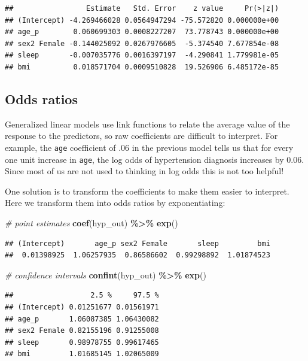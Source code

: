 \documentclass[
]{book}
\newenvironment{Shaded}{\begin{snugshade}}{\end{snugshade}}
\newcommand{\CommentTok}[1]{\textcolor[rgb]{0.56,0.35,0.01}{\textit{#1}}}
\newcommand{\KeywordTok}[1]{\textcolor[rgb]{0.13,0.29,0.53}{\textbf{#1}}}
\newcommand{\NormalTok}[1]{#1}
\newcommand{\OperatorTok}[1]{\textcolor[rgb]{0.81,0.36,0.00}{\textbf{#1}}}
\newcommand{\StringTok}[1]{\textcolor[rgb]{0.31,0.60,0.02}{#1}}
\begin{document}
\begin{verbatim}
##                 Estimate   Std. Error    z value     Pr(>|z|)
## (Intercept) -4.269466028 0.0564947294 -75.572820 0.000000e+00
## age_p        0.060699303 0.0008227207  73.778743 0.000000e+00
## sex2 Female -0.144025092 0.0267976605  -5.374540 7.677854e-08
## sleep       -0.007035776 0.0016397197  -4.290841 1.779981e-05
## bmi          0.018571704 0.0009510828  19.526906 6.485172e-85
\end{verbatim}

\hypertarget{odds-ratios}{%
\subsection{Odds ratios}\label{odds-ratios}}

Generalized linear models use link functions to relate the average value of the response to the predictors,
so raw coefficients are difficult to interpret. For example, the \texttt{age} coefficient of .06 in the previous
model tells us that for every one unit increase in \texttt{age}, the log odds of hypertension diagnosis increases
by 0.06. Since most of us are not used to thinking in log odds this is not too helpful!

One solution is to transform the coefficients to make them easier to interpret.
Here we transform them into odds ratios by exponentiating:

\begin{Shaded}
\begin{Highlighting}[]
  \CommentTok{\# point estimates}
  \KeywordTok{coef}\NormalTok{(hyp\_out) }\OperatorTok{\%\textgreater{}\%}\StringTok{ }\KeywordTok{exp}\NormalTok{()}
\end{Highlighting}
\end{Shaded}

\begin{verbatim}
## (Intercept)       age_p sex2 Female       sleep         bmi 
##  0.01398925  1.06257935  0.86586602  0.99298892  1.01874523
\end{verbatim}

\begin{Shaded}
\begin{Highlighting}[]
  \CommentTok{\# confidence intervals}
  \KeywordTok{confint}\NormalTok{(hyp\_out) }\OperatorTok{\%\textgreater{}\%}\StringTok{ }\KeywordTok{exp}\NormalTok{()}
\end{Highlighting}
\end{Shaded}

\begin{verbatim}
##                  2.5 %     97.5 %
## (Intercept) 0.01251677 0.01561971
## age_p       1.06087385 1.06430082
## sex2 Female 0.82155196 0.91255008
## sleep       0.98978755 0.99617465
## bmi         1.01685145 1.02065009
\end{verbatim}
\end{document}
